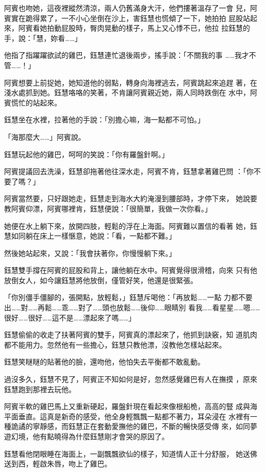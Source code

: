阿賓也吻她，這夜裡縱然清涼，兩人仍舊滿身大汗，他們摟著溫存了一會
兒，阿賓實在跪得累了，一不小心坐倒在沙上，害鈺慧也慌傾了一下，她拍拍
屁股站起來，阿賓看她拍動屁股時，臀肉晃動的樣子，馬上又心悸不已，他拉
拉鈺慧的手，說：「慧，妳看……」

他指了指躍躍欲試的雞巴，鈺慧連忙退後兩步，搖手說：「不關我的事
……我才不管……！」

阿賓想要上前捉她，她知道他的弱點，轉身向海裡逃去，阿賓跳起來追趕
著，在淺水處抓到她。鈺慧咯咯的笑著，不肯讓阿賓親近她，兩人同時跌倒在
水中，阿賓慌忙的站起來。

鈺慧坐在水裡，拉著他的手說：「別擔心嘛，海一點都不可怕。」

「海那麼大……」阿賓說。

鈺慧玩起他的雞巴，呵呵的笑說：「你有羅盤針啊。」

阿賓提議回去洗澡，鈺慧卻拖著他往深水走，阿賓不肯，鈺慧拿著雞巴問
：「你不要了嗎？」

阿賓當然要，只好跟她走，鈺慧走到海水大約淹漫到腰部時，才停下來，
她說要教阿賓仰漂，阿賓哪裡肯，鈺慧便說：「很簡單，我做一次你看。」

她便在水上躺下來，放開四肢，輕鬆的浮在上海面。阿賓難以置信的看著
她，鈺慧如同躺在床上一樣愜意，她說：「看，一點都不難。」

然後她站起來，又說：「我會扶著你，你慢慢躺下來。」

鈺慧雙手撐在阿賓的屁股和背上，讓他躺在水中。阿賓覺得很滑稽，向來
只有他放倒女人，如今讓鈺慧將他放倒，僅管好笑，他還是很緊張。

「你別僵手僵腳的，張開點，放輕鬆，」鈺慧斥喝他：「再放鬆……一點
力都不要出……對……再鬆……乖……對了……頭也放鬆……後仰……眼睛別
看我……看星星……嗯……很好……很好……這不是……漂起來了嗎……」

鈺慧偷偷的收走了扶著阿賓的雙手，阿賓真的漂起來了，他抓到訣竅，知
道肌肉都不能用力。忽然他有一些擔心，鈺慧只教他漂，沒教他怎樣站起來。

鈺慧笑瞇瞇的貼著他的臉，還吻他，他怕失去平衡都不敢亂動。

過沒多久，鈺慧不見了，阿賓正不知如何是好，忽然感覺雞巴有人在撫摸
，原來鈺慧跑到那裡去玩他。

阿賓半軟的雞巴馬上又重新硬起，羅盤針現在看起來像根船桅，高高的豎
成與海平面垂直。這真是新奇的感受，他全身輕飄飄一點都不著力，耳朵浸在
水裡有一種詭譎的寧靜感，而鈺慧正在套動愛撫他的雞巴，不斷的暢快感受傳
來，如同夢遊幻境，他有點曉得為什麼鈺慧剛才會哭的原因了。

鈺慧看他閉眼睡在海面上，一副飄飄欲仙的樣子，知道情人正十分舒服，
她送佛送到西，輕啟朱唇，吻上了雞巴。

